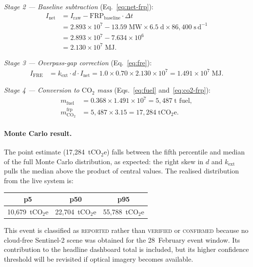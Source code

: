 \documentclass[11pt]{article}
\begin{document}
\noindent\emph{Stage 2 --- Baseline subtraction}
(Eq.~\eqref{eq:net-frp}):
\begin{align*}
I_{\mathrm{net}}
  &= I_{\mathrm{raw}}
     - \mathrm{FRP}_{\mathrm{baseline}} \cdot \Delta t \\
  &= 2.893 \times 10^{7}
     - 13.59\;\mathrm{MW}
       \times 6.5\;\mathrm{d}
       \times 86{,}400\;\mathrm{s\,d^{-1}} \\
  &= 2.893 \times 10^{7} - 7.634 \times 10^{6} \\
  &= 2.130 \times 10^{7}\;\text{MJ}.
\end{align*}

\noindent\emph{Stage 3 --- Overpass-gap correction}
(Eq.~\eqref{eq:fre}):
\begin{align*}
I_{\mathrm{FRE}}
  &= k_{\mathrm{ext}} \cdot d \cdot I_{\mathrm{net}}
   = 1.0 \times 0.70 \times 2.130 \times 10^{7}
   = 1.491 \times 10^{7}\;\text{MJ}.
\end{align*}

\noindent\emph{Stage 4 --- Conversion to $\mathrm{CO_2}$ mass}
(Eqs.~\eqref{eq:fuel} and~\eqref{eq:co2-frp}):
\begin{align*}
m_{\mathrm{fuel}}
  &= 0.368 \times 1.491 \times 10^{7}
   = 5{,}487\;\text{t fuel}, \\
m_{\mathrm{CO_2}}^{\mathrm{frp}}
  &= 5{,}487 \times 3.15
   = 17{,}284\;\text{tCO}_2\text{e}.
\end{align*}

\paragraph{Monte Carlo result.}
The point estimate (17,284~tCO$_2$e) falls between the fifth percentile
and median of the full Monte Carlo distribution, as expected: the right
skew in $d$ and $k_{\mathrm{ext}}$ pulls the median above the product of
central values. The realised distribution from the live system is:

\begin{center}
\begin{tabular}{@{}ccc@{}}
\toprule
p5 & p50 & p95 \\
\midrule
10,679~tCO$_2$e & 22,704~tCO$_2$e & 55,788~tCO$_2$e \\
\bottomrule
\end{tabular}
\end{center}

\noindent This event is classified as \textsc{reported} rather than
\textsc{verified} or \textsc{confirmed} because no cloud-free Sentinel-2
scene was obtained for the 28~February event window. Its contribution to
the headline dashboard total is included, but its higher confidence
threshold will be revisited if optical imagery becomes available.
\end{document}
